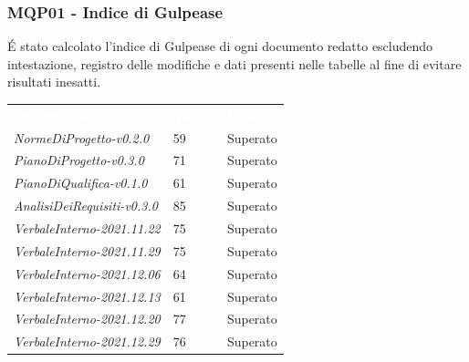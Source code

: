 \subsubsection{MQP01 - Indice di Gulpease}
É stato calcolato l'indice di Gulpease di ogni documento redatto escludendo intestazione, registro delle modifiche e dati presenti nelle tabelle al fine di evitare risultati inesatti.
\begin{table}[H]
        \renewcommand{\arraystretch}{1.5}
        \begin{tabular}{m{}<{\centering}  m{}<{\centering}  m{}<{\centering} }
            \rowcolor{darkblue}
            \textcolor{white}{\textbf{Documento}}& \textcolor{white}{\textbf{Valore}} & \textcolor{white}{\textbf{Esito}}\\ 
            
			\textit{NormeDiProgetto-v0.2.0} &
            59 &
            Superato \\

            \textit{PianoDiProgetto-v0.3.0} &
            71 &
            Superato \\

            \textit{PianoDiQualifica-v0.1.0} &
            61 &
            Superato \\

            \textit{AnalisiDeiRequisiti-v0.3.0} &
            85 &
            Superato \\

            \textit{VerbaleInterno-2021.11.22}&
            75 &
            Superato \\

            \textit{VerbaleInterno-2021.11.29}&
            75 &
            Superato \\
            
            \textit{VerbaleInterno-2021.12.06}&
            64 &
            Superato \\
            
            \textit{VerbaleInterno-2021.12.13}&
            61 &
            Superato \\
            
            \textit{VerbaleInterno-2021.12.20}&
            77 &
            Superato \\
            
            \textit{VerbaleInterno-2021.12.29}&
            76 &
            Superato \\
            

\end{tabular}
\end{table}

